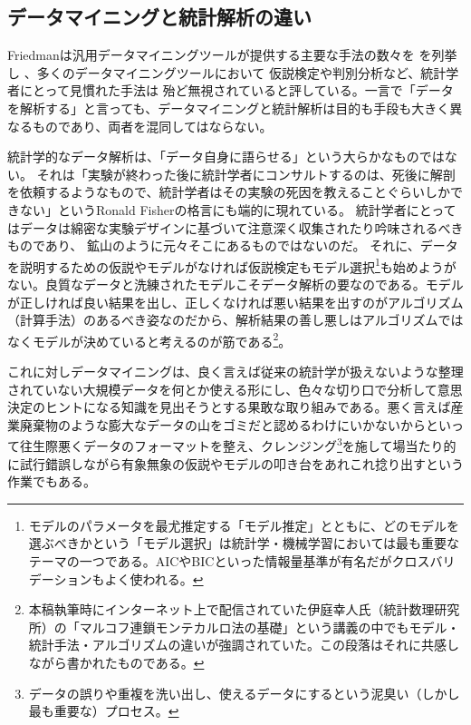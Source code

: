 \subsection{データマイニングと統計解析の違い}
Friedmanは汎用データマイニングツールが提供する主要な手法の数々を
を列挙し
、多くのデータマイニングツールにおいて
仮説検定や判別分析など、統計学者にとって見慣れた手法は
殆ど無視されていると評している。一言で「データを解析する」と言っても、データマイニングと統計解析は目的も手段も大きく異なるものであり、両者を混同してはならない。

統計学的なデータ解析は、「データ自身に語らせる」という大らかなものではない。
それは「実験が終わった後に統計学者にコンサルトするのは、死後に解剖を依頼するようなもので、統計学者はその実験の死因を教えることぐらいしかできない」というRonald Fisherの格言にも端的に現れている。
統計学者にとってはデータは綿密な実験デザインに基づいて注意深く収集されたり吟味されるべきものであり、
鉱山のように元々そこにあるものではないのだ。
それに、データを説明するための仮説やモデルがなければ仮説検定もモデル選択\footnote{モデルのパラメータを最尤推定する「モデル推定」とともに、どのモデルを選ぶべきかという「モデル選択」は統計学・機械学習においては最も重要なテーマの一つである。AICやBICといった情報量基準が有名だがクロスバリデーションもよく使われる。}も始めようがない。良質なデータと洗練されたモデルこそデータ解析の要なのである。モデルが正しければ良い結果を出し、正しくなければ悪い結果を出すのがアルゴリズム（計算手法）のあるべき姿なのだから、解析結果の善し悪しはアルゴリズムではなくモデルが決めていると考えるのが筋である\footnote{本稿執筆時にインターネット上で配信されていた伊庭幸人氏（統計数理研究所）の「マルコフ連鎖モンテカルロ法の基礎」という講義の中でもモデル・統計手法・アルゴリズムの違いが強調されていた。この段落はそれに共感しながら書かれたものである。}。

これに対しデータマイニングは、良く言えば従来の統計学が扱えないような整理されていない大規模データを何とか使える形にし、色々な切り口で分析して意思決定のヒントになる知識を見出そうとする果敢な取り組みである。悪く言えば産業廃棄物のような膨大なデータの山をゴミだと認めるわけにいかないからといって往生際悪くデータのフォーマットを整え、クレンジング\footnote{データの誤りや重複を洗い出し、使えるデータにするという泥臭い（しかし最も重要な）プロセス。}を施して場当たり的に試行錯誤しながら有象無象の仮説やモデルの叩き台をあれこれ捻り出すという作業でもある。

